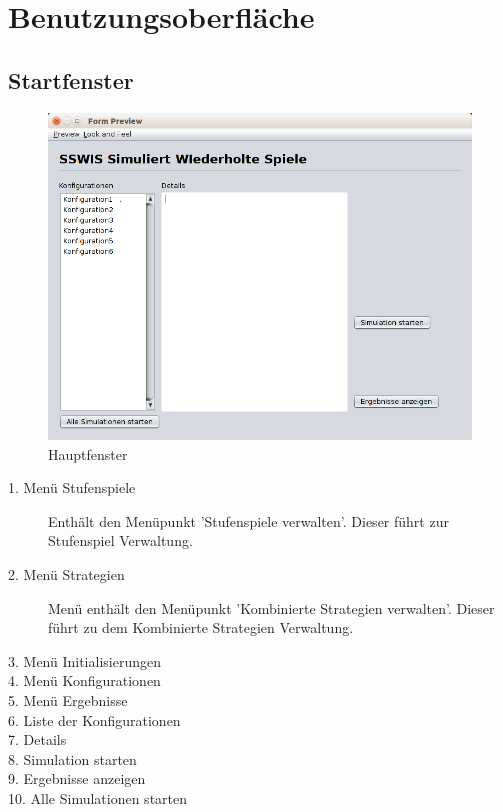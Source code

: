 \section{Benutzungsoberfläche}


\subsection{Startfenster}

\begin{figure}[hp] 
  \centering
     \includegraphics[width=1.1\textwidth]{GUI_Entwurf/Startfenster.png}
  \caption{Hauptfenster}
  \label{fig:Bild1}
\end{figure}

\begin{description}


\item[1. Menü Stufenspiele] Enthält den Menüpunkt 'Stufenspiele verwalten'. Dieser führt zur Stufenspiel Verwaltung.

\item[2. Menü Strategien] Menü enthält den Menüpunkt 'Kombinierte Strategien verwalten'. Dieser führt zu dem Kombinierte Strategien Verwaltung.

\item[3. Menü Initialisierungen] 

\item[4. Menü Konfigurationen] 

\item[5. Menü Ergebnisse] 

\item[6. Liste der Konfigurationen] 

\item[7. Details]

\item[8. Simulation starten] 

\item[9. Ergebnisse anzeigen]

\item[10. Alle Simulationen starten]

\end{description}

